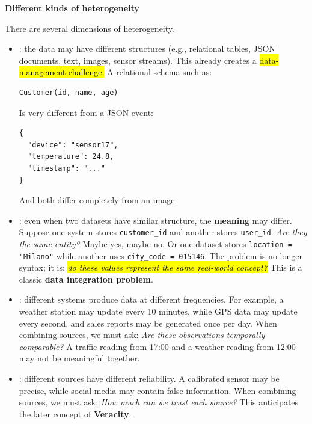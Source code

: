 \highspace
\begin{flushleft}
    \textcolor{Green3}{ \textbf{Different kinds of heterogeneity}}
\end{flushleft}
There are several dimensions of heterogeneity.
\begin{itemize}
    \item {}: the data may have different structures (e.g., relational tables, JSON documents, text, images, sensor streams). This already creates a \hl{data-management challenge.} A relational schema such as:
\begin{lstlisting}
Customer(id, name, age)
\end{lstlisting}
        Is very different from a JSON event:
\begin{lstlisting}
{
  "device": "sensor17",
  "temperature": 24.8,
  "timestamp": "..."
}
\end{lstlisting}
        And both differ completely from an image.

    \item {}: even when two datasets have similar structure, the \textbf{meaning} may differ. Suppose one system stores \texttt{customer\_id} and another stores \texttt{user\_id}. \emph{Are they the same entity?} Maybe yes, maybe no. Or one dataset stores \texttt{location = "Milano"} while another uses \texttt{city\_code = 015146}. The problem is no longer syntax; it is: \hl{\emph{do these values represent the same real-world concept?}} This is a classic \textbf{data integration problem}.

    \item {}: different systems produce data at different frequencies. For example, a weather station may update every 10 minutes, while GPS data may update every second, and sales reports may be generated once per day. When combining sources, we must ask: \emph{Are these observations temporally comparable?} A traffic reading from 17:00 and a weather reading from 12:00 may not be meaningful together.

    \item {}: different sources have different reliability. A calibrated sensor may be precise, while social media may contain false information. When combining sources, we must ask: \emph{How much can we trust each source?} This anticipates the later concept of \textbf{Veracity}.
\end{itemize}

